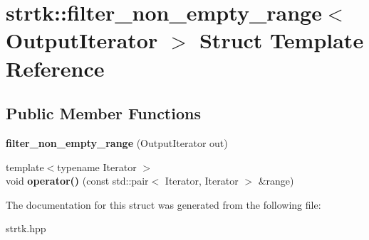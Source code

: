 \hypertarget{structstrtk_1_1filter__non__empty__range}{\section{strtk\-:\-:filter\-\_\-non\-\_\-empty\-\_\-range$<$ Output\-Iterator $>$ Struct Template Reference}
\label{structstrtk_1_1filter__non__empty__range}
}
\subsection*{Public Member Functions}
\begin{DoxyCompactItemize}
\item 
\hypertarget{structstrtk_1_1filter__non__empty__range_af8c6b151212f98ef7445aae995244d2e}{{\bfseries filter\-\_\-non\-\_\-empty\-\_\-range} (Output\-Iterator out)}\label{structstrtk_1_1filter__non__empty__range_af8c6b151212f98ef7445aae995244d2e}

\item 
\hypertarget{structstrtk_1_1filter__non__empty__range_ac7079947ac98e16361a263275c8f3291}{{\footnotesize template$<$typename Iterator $>$ }\\void {\bfseries operator()} (const std\-::pair$<$ Iterator, Iterator $>$ \&range)}\label{structstrtk_1_1filter__non__empty__range_ac7079947ac98e16361a263275c8f3291}

\end{DoxyCompactItemize}


The documentation for this struct was generated from the following file\-:\begin{DoxyCompactItemize}
\item 
strtk.\-hpp\end{DoxyCompactItemize}

